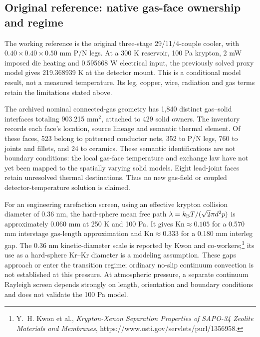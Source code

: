 \clearpage
\subsection{Original reference: native gas-face ownership and regime}
The working reference is the original three-stage 29/11/4-couple cooler, with $0.40\times0.40\times0.50$ mm P/N legs. At a 300 K reservoir, 100 Pa krypton, 2 mW imposed die heating and 0.595668 W electrical input, the previously solved proxy model gives 219.368939 K at the detector mount. This is a conditional model result, not a measured temperature. Its leg, copper, wire, radiation and gas terms retain the limitations stated above.

The archived nominal connected-gas geometry has 1,840 distinct gas--solid interfaces totaling 903.215 mm$^2$, attached to 429 solid owners. The inventory records each face's location, source lineage and semantic thermal element. Of these faces, 523 belong to patterned conductor nets, 352 to P/N legs, 760 to joints and fillets, and 24 to ceramics. These semantic identifications are not boundary conditions: the local gas-face temperature and exchange law have not yet been mapped to the spatially varying solid models. Eight lead-joint faces retain unresolved thermal destinations. Thus no new gas-field or coupled detector-temperature solution is claimed.

For an engineering rarefaction screen, using an effective krypton collision diameter of 0.36 nm, the hard-sphere mean free path $\lambda=k_{\rm B}T/(\sqrt{2}\pi d^2p)$ is approximately 0.060 mm at 250 K and 100 Pa. It gives $\mathrm{Kn}\approx0.105$ for a 0.570 mm interstage gas-length approximation and $\mathrm{Kn}\approx0.333$ for a 0.180 mm interleg gap. The 0.36 nm kinetic-diameter scale is reported by Kwon and co-workers;\footnote{Y.~H. Kwon et al., \emph{Krypton-Xenon Separation Properties of SAPO-34 Zeolite Materials and Membranes}, https://www.osti.gov/servlets/purl/1356958.} its use as a hard-sphere Kr--Kr diameter is a modeling assumption. These gaps approach or enter the transition regime; ordinary no-slip continuum convection is not established at this pressure. At atmospheric pressure, a separate continuum Rayleigh screen depends strongly on length, orientation and boundary conditions and does not validate the 100 Pa model.
